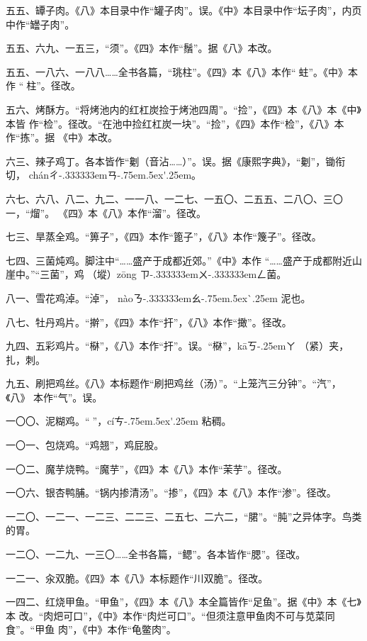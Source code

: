 \begin{list}{}
五五、罈子肉。《八》本目录中作“罐子肉”。误。《中》本目录中作“坛子肉”，内页
中作“罎子肉”。

五五、六九、一五三，“须”。《四》本作“鬚”。据《八》本改。

五五、一八六、一八八……全书各篇，“珧柱”。《四》本《八》本作“𧎼蛀”。《中》本作
“𧎼柱”。径改。

五六、烤酥方。“将烤池内的红杠炭捡于烤池四周”。“捡”，《四》本《八》本《中》本皆
作“检”。径改。“在池中捡红杠炭一块”。“捡”，《四》本作“检”，《八》本作“拣”。据
《中》本改。

六三、辣子鸡丁。各本皆作“劖（音沾……）”。误。据《康熙字典》，“劖”，锄衔切，
{ch\'{a}n}{ㄔ\kern-.333333emㄢ\kern-.75em\raise.5ex\hbox{\'{}}\kern.25em}。

六七、六八、八二、九二、一一八、一二七、一五〇、二五五、二八〇、三〇一，“熘”。
《四》本《八》本作“溜”。径改。

七三、旱蒸全鸡。“箅子”，《四》本作“篦子”，《八》本作“篾子”。径改。

七四、三菌炖鸡。脚注{\footnotesize{}}中“……盛产于成都近郊。”《中》本作
“……盛产于成都附近山崖中。”“三菌”，鸡𭎂（㙡）{z\={o}ng}%
{ㄗ\kern-.333333emㄨ\kern-.333333emㄥ}菌。

八一、雪花鸡淖。“淖”，
{n\`{a}o}{ㄋ\kern-.333333emㄠ\kern-.75em\raise.5ex\hbox{\`{}}\kern.25em} 泥也。

八七、牡丹鸡片。“擀”，《四》本作“扞”，《八》本作“撖”。径改。

九四、五彩鸡片。“㮟”，《八》本作“扞”。误。“㮟”，{k\={a}}{ㄎ\kern-.25emㄚ}
（紧）夹，扎，刺。

九五、刷把鸡丝。《八》本标题作“刷把鸡丝（汤）”。“上笼汽三分钟”。“汽”，《八》
本作“气”。误。

一〇〇、泥糊鸡。“𫃕”，{c\'{i}}{ㄘ\kern-.75em\raise.5ex\hbox{\'{}}\kern.25em}
粘稠。

一〇一、包烧鸡。“鸡翘”，鸡屁股。

一〇二、魔芋烧鸭。“魔芋”，《四》本《八》本作“茉芋”。径改。

一〇六、银杏鸭脯。“锅内掺清汤”。“掺”，《四》本《八》本作“渗”。径改。

一二〇、一二一、一二三、二二三、二五七、二六二，“𬂁”。“肫”之异体字。鸟类的胃。

一二〇、一二九、一三〇……全书各篇，“鳃”。各本皆作“腮”。径改。

一二一、汆双脆。《四》本《八》本标题作“川双脆”。径改。

一四二、红烧甲鱼。“甲鱼”，《四》本《八》本全篇皆作“足鱼”。据《中》本《七》本
改。“肉𤆵可口”，《中》本作“肉烂可口”。“但须注意甲鱼肉不可与苋菜同食”。“甲鱼
肉”，《中》本作“龟鳖肉”。


\end{list}
